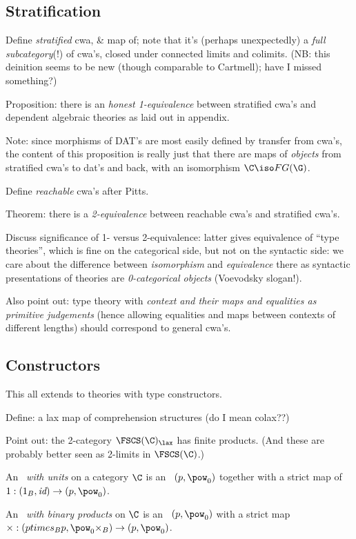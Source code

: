 \subsection*{Stratification}

Define \emph{stratified} cwa, \& map of; note that it's (perhaps unexpectedly) a \emph{full subcategory}(!) of cwa's, closed under connected limits and colimits. (NB: this deinition seems to be new (though comparable to Cartmell); have I missed something?)

Proposition: there is an \emph{honest 1-equivalence} between stratified cwa's and dependent algebraic theories as laid out in appendix.

Note: since morphisms of DAT's are most easily defined by transfer from cwa's, the content of this proposition is really just that there are maps of \emph{objects} from stratified cwa's to dat's and back, with an isomorphism $\C \iso FG(\G)$.

Define \emph{reachable} cwa's after Pitts.

Theorem: there is a \emph{2-equivalence} between reachable cwa's and stratified cwa's.

Discuss significance of 1- versus 2-equivalence: latter gives equivalence of ``type theories'', which is fine on the categorical side, but not on the syntactic side: we care about the difference between \emph{isomorphism} and \emph{equivalence} there as syntactic presentations of theories are \emph{0-categorical objects} (Voevodsky slogan!).

Also point out: type theory with \emph{context and their maps and equalities as primitive judgements} (hence allowing equalities and maps between contexts of different lengths) should correspond to general cwa's.

\subsection*{Constructors}
This all extends to theories with type constructors.

Define: a lax map of comprehension structures (do I mean colax??)

Point out: the 2-category $\mathbf{\FSCS(\C)_\lax}$ has finite products.  (And these are probably better seen as 2-limits in $\FSCS(\C)$.)

\begin{definition}
An \emph{\fscs\ with units} on a category $\C$ is an \fscs\ $(p,\pow_0)$ together with a strict map of \fscss\ $1 : (1_B,\textit{id}) \to (p,\pow_0)$. 

An \emph{\fscs\ with binary products} on $\C$ is an \fscs\ $(p,\pow_0)$ with a strict map $ \times : (p times_B p, \pow_0 \times_B) \to (p,\pow_0)$. 
\end{definition}

